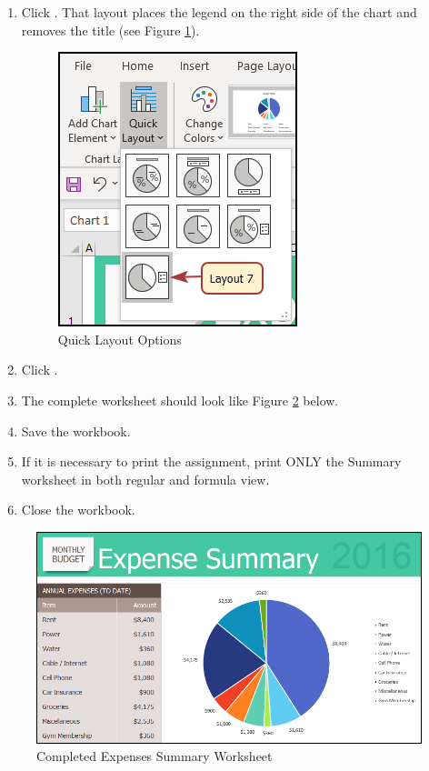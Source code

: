 \begin{enumerate}[resume]
	\item Click . That layout places the legend on the right side of the chart and removes the title (see Figure \ref{06:fig07a}).

	\begin{figure}[H]
		\centering
		\includegraphics[width=\maxwidth{.60\linewidth}]{gfx/ch06_fig07a}
		\caption{Quick Layout Options}
		\label{06:fig07a}
	\end{figure}

	\item Click .
	\item The complete  worksheet should look like Figure \ref{06:fig08} below.
	\item Save the workbook. 
	\item If it is necessary to print the assignment, print ONLY the Summary worksheet in both regular and formula view. 
	\item Close the workbook.
\end{enumerate}

\begin{figure}[H]
	\centering
	\includegraphics[width=\maxwidth{.95\linewidth}]{gfx/ch06_fig08}
	\caption{Completed Expenses Summary Worksheet}
	\label{06:fig08}
\end{figure}

